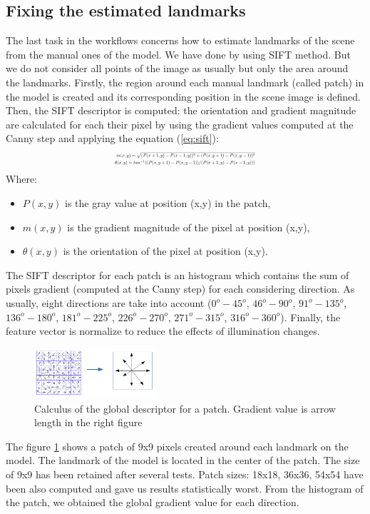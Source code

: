 \documentclass[twoside,twocolumn,10pt]{article}
\begin{document}
\subsection{Fixing the estimated landmarks}
The last task in the workflows concerns how to estimate landmarks of the scene from the manual ones of the model. We have done by using SIFT\cite{lowe2004distinctive} method. But we do not consider all points of the image as usually but only the area around the landmarks. Firstly, the region around each manual landmark (called patch) in the model is created and its corresponding position in the scene image is defined. Then, the SIFT descriptor is computed: the orientation and gradient magnitude are calculated for each their pixel by using the gradient values computed at the Canny step and applying the equation (\ref{eq:sift}):
\begin{equation}
\label{eq:sift}
\resizebox{.41 \textwidth}{!} 
{$
\begin{aligned}
	m(x,y) = \sqrt{(P(x+1,y) - P(x-1,y))^2 + (P(x,y+1) - P(x,y-1))^2} \\
	\theta(x,y) = tan^{-1}((P(x,y+1) - P(x,y-1))/(P(x+1,y) - P(x-1,y)))
	\end{aligned}
$}
\end{equation}
Where:
\begin{itemize}
	\item $P(x,y)$ is the gray value at position (x,y) in the patch,
	\item $m(x,y)$ is the gradient magnitude of the pixel at position (x,y),
	\item $\theta(x,y)$ is the orientation of the pixel at position (x,y).
\end{itemize}
The SIFT descriptor for each patch is an histogram which contains the sum of pixels gradient (computed at the Canny step) for each considering direction. As usually, eight directions are take into account ($0^o - 45^o$, $46^o - 90^o$, $91^o - 135^o$, $136^o - 180^o$, $181^o - 225^o$, $226^o - 270^o$, $271^o - 315^o$, $316^o - 360^o$). Finally, the feature vector is normalize to reduce the effects of illumination changes.

\begin{figure}[htb]
    \centering
    \includegraphics[width=0.4\textwidth]{./images/keypoint_descriptor}
    \caption{Calculus of the global descriptor for a patch. Gradient value is arrow length in the right figure}
    \label{fig:kpdescriptor}
\end{figure}
The figure \ref{fig:kpdescriptor} shows a patch of 9x9 pixels created around each landmark on the model. The landmark of the model is located in the center of the patch. The size of 9x9 has been retained after several tests. Patch sizes: 18x18, 36x36, 54x54 have been also computed and gave us results statistically worst. From the histogram of the patch, we obtained the global gradient value for each direction.\\
\end{document}
